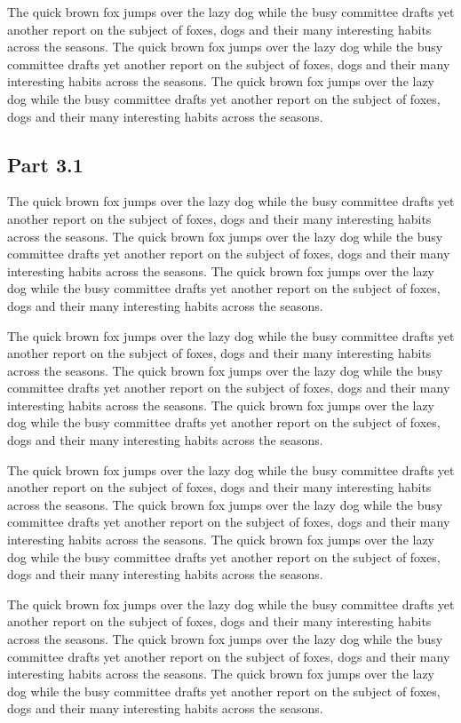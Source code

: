 \documentclass{article}
\begin{document}
The quick brown fox jumps over the lazy dog while the busy committee drafts yet another report on the subject of foxes, dogs and their many interesting habits across the seasons. The quick brown fox jumps over the lazy dog while the busy committee drafts yet another report on the subject of foxes, dogs and their many interesting habits across the seasons. The quick brown fox jumps over the lazy dog while the busy committee drafts yet another report on the subject of foxes, dogs and their many interesting habits across the seasons. 

\subsection{Part 3.1}
The quick brown fox jumps over the lazy dog while the busy committee drafts yet another report on the subject of foxes, dogs and their many interesting habits across the seasons. The quick brown fox jumps over the lazy dog while the busy committee drafts yet another report on the subject of foxes, dogs and their many interesting habits across the seasons. The quick brown fox jumps over the lazy dog while the busy committee drafts yet another report on the subject of foxes, dogs and their many interesting habits across the seasons. 

The quick brown fox jumps over the lazy dog while the busy committee drafts yet another report on the subject of foxes, dogs and their many interesting habits across the seasons. The quick brown fox jumps over the lazy dog while the busy committee drafts yet another report on the subject of foxes, dogs and their many interesting habits across the seasons. The quick brown fox jumps over the lazy dog while the busy committee drafts yet another report on the subject of foxes, dogs and their many interesting habits across the seasons. 

The quick brown fox jumps over the lazy dog while the busy committee drafts yet another report on the subject of foxes, dogs and their many interesting habits across the seasons. The quick brown fox jumps over the lazy dog while the busy committee drafts yet another report on the subject of foxes, dogs and their many interesting habits across the seasons. The quick brown fox jumps over the lazy dog while the busy committee drafts yet another report on the subject of foxes, dogs and their many interesting habits across the seasons. 

The quick brown fox jumps over the lazy dog while the busy committee drafts yet another report on the subject of foxes, dogs and their many interesting habits across the seasons. The quick brown fox jumps over the lazy dog while the busy committee drafts yet another report on the subject of foxes, dogs and their many interesting habits across the seasons. The quick brown fox jumps over the lazy dog while the busy committee drafts yet another report on the subject of foxes, dogs and their many interesting habits across the seasons. 
\end{document}
